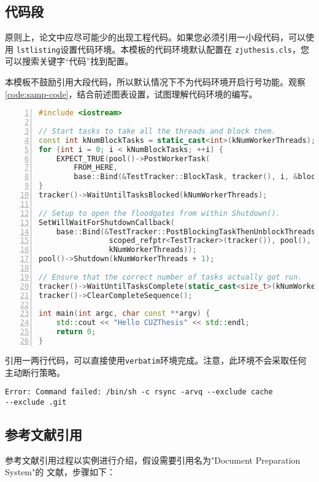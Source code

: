 \subsection{代码段}

原则上，论文中应尽可能少的出现工程代码。如果您必须引用一小段代码，可以使用
\texttt{lstlisting}设置代码环境。本模板的代码环境默认配置在
\texttt{zjuthesis.cls}，您可以搜索关键字“代码”找到配置。

本模板不鼓励引用大段代码，所以默认情况下不为代码环境开启行号功能。观察
\autoref{code:samp-code}，结合前述图表设置，试图理解代码环境的编写。

\begin{lstlisting}[language=C++,numbers=left, numberstyle=\tiny,label=code:samp-code, caption=一段Chromium的源代码]
#include <iostream>

// Start tasks to take all the threads and block them.
const int kNumBlockTasks = static_cast<int>(kNumWorkerThreads);
for (int i = 0; i < kNumBlockTasks; ++i) {
    EXPECT_TRUE(pool()->PostWorkerTask(
        FROM_HERE,
        base::Bind(&TestTracker::BlockTask, tracker(), i, &blocker)));
}
tracker()->WaitUntilTasksBlocked(kNumWorkerThreads);

// Setup to open the floodgates from within Shutdown().
SetWillWaitForShutdownCallback(
    base::Bind(&TestTracker::PostBlockingTaskThenUnblockThreads,
                scoped_refptr<TestTracker>(tracker()), pool(), &blocker,
                kNumWorkerThreads));
pool()->Shutdown(kNumWorkerThreads + 1);

// Ensure that the correct number of tasks actually got run.
tracker()->WaitUntilTasksComplete(static_cast<size_t>(kNumWorkerThreads + 1));
tracker()->ClearCompleteSequence();

int main(int argc, char const **argv) {
    std::cout << "Hello CUZThesis" << std::endl;
    return 0;
}
\end{lstlisting}

引用一两行代码，可以直接使用\texttt{verbatim}环境完成。注意，此环境不会采取任何
主动断行策略。
\begin{verbatim}
Error: Command failed: /bin/sh -c rsync -arvq --exclude cache
--exclude .git 
\end{verbatim}

\subsection{参考文献引用}

参考文献引用过程以实例进行介绍，假设需要引用名为"Document Preparation System"的
文献，步骤如下：

